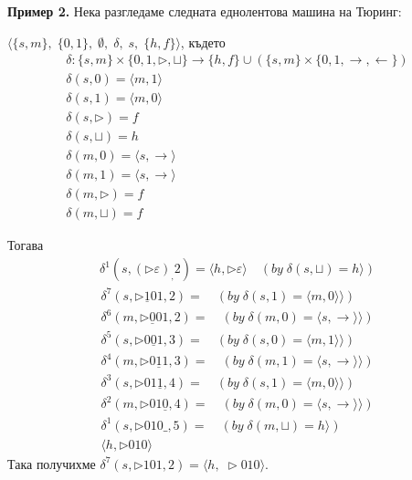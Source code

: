 \documentclass[14pt]{extarticle}
\begin{document}
\textbf{Пример 2.} Нека разгледаме следната еднолентова машина на Тюринг:

\(\langle \{s, m\},\; \{0, 1\},\; \emptyset,\; \delta,\; s,\; \{h, f\} \rangle\), където
\begin{align*}
    \delta : \{s, m\} \times \{0, 1, \triangleright, \sqcup\} \to \{h, f\} \cup (\{s, m\} \times \{0, 1, \rightarrow, \leftarrow \}) \\
    \delta(s, 0) = \langle m, 1 \rangle \\
    \delta(s, 1) = \langle m, 0 \rangle \\
    \delta(s, \triangleright) = f \\
    \delta(s, \sqcup) = h \\
    \delta(m, 0) = \langle s, \rightarrow \rangle \\
    \delta(m, 1) = \langle s, \rightarrow \rangle \\
    \delta(m, \triangleright) = f \\
    \delta(m, \sqcup) =  f 
\end{align*}

Тогава
\begin{align*}
    \delta^1(s, (\triangleright \varepsilon)_, 2) = \langle h, \triangleright\varepsilon \rangle  \quad (by \; \delta(s, \sqcup) = h \rangle)
\end{align*}
\begin{align*}
    \delta^7(s, \triangleright \underline{1}01, 2) =  \quad (by \; \delta(s, 1) = \langle m, 0 \rangle \rangle) \\
    \delta^6(m, \triangleright \underline{0}01, 2) =  \quad (by \; \delta(m, 0) = \langle s, \rightarrow \rangle \rangle) \\
    \delta^5(s, \triangleright 0\underline{0}1, 3) =  \quad (by \; \delta(s, 0) = \langle m, 1 \rangle \rangle) \\
    \delta^4(m, \triangleright 0\underline{1}1, 3) =  \quad (by \; \delta(m, 1) = \langle s, \rightarrow \rangle \rangle) \\
    \delta^3(s, \triangleright 01\underline{1}, 4) =  \quad (by \; \delta(s, 1) = \langle m, 0 \rangle \rangle) \\
    \delta^2(m, \triangleright 01\underline{0}, 4) =  \quad (by \; \delta(m, 0) = \langle s, \rightarrow \rangle \rangle) \\
    \delta^1(s, \triangleright 010\_, 5) =  \quad (by \; \delta(m, \sqcup) = h \rangle) \\
    \langle h, \triangleright 010 \rangle
\end{align*}
Така получихме \(\delta^7(s, \triangleright 101, 2) = \langle h,\; \triangleright 010 \rangle\).
\end{document}
